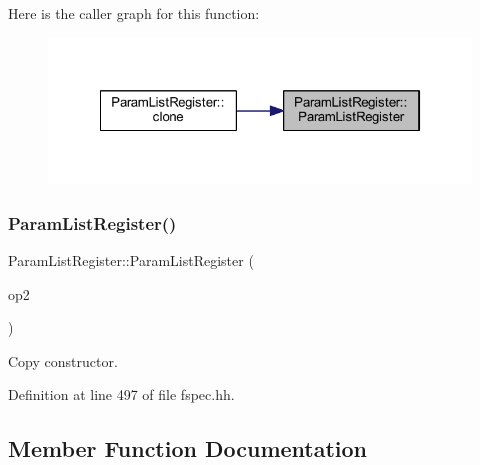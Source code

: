 Here is the caller graph for this function\+:
\nopagebreak
\begin{figure}[H]
\begin{center}
\leavevmode
\includegraphics[width=322pt]{class_param_list_register_aca64ac19f3dc898fc7d12062c76acf59_icgraph}
\end{center}
\end{figure}
\mbox{\label{class_param_list_register_ab6c82537acb4d9e382dcbf438baebd0d}} 
\subsubsection{\texorpdfstring{ParamListRegister()}{ParamListRegister()}\hspace{0.1cm}{\footnotesize\ttfamily [2/2]}}
{\footnotesize\ttfamily Param\+List\+Register\+::\+Param\+List\+Register (\begin{DoxyParamCaption}\item[{const \mbox{\hyperlink{class_param_list_register}{Param\+List\+Register}} \&}]{op2 }\end{DoxyParamCaption})\hspace{0.3cm}{\ttfamily [inline]}}



Copy constructor. 



Definition at line 497 of file fspec.\+hh.



\subsection{Member Function Documentation}
\mbox{\label{class_param_list_register_a1c4f79c909f11b3859f93f293acb9a1d}} 
